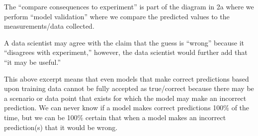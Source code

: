 \documentclass[12pt]{article}
\begin{document}
\begin{enumerate}
\begin{tcolorbox}[colback=white, sharp corners]
The 	``compare consequences to experiment'' is part of the diagram in 2a where we perform 	``model validation'' where we compare the predicted values to the measurements/data collected.

\end{tcolorbox}


\begin{tcolorbox}[colback=white, sharp corners]

A data scientist may agree with the claim that the guess is ``wrong'' because it ``disagrees with experiment,'' however, the data scientist would further add that ``it may be useful.''

\end{tcolorbox}


\begin{tcolorbox}[colback=white, sharp corners]

This above excerpt means that even models that make correct predictions based upon training data cannot be fully accepted as true/correct because there may be a scenario or data point that exists for which the model may make an incorrect prediction. We can never know if a model makes correct predictions 100\% of the time, but we can be 100\% certain that when a model makes an incorrect prediction(s) that it would be wrong. 

\end{tcolorbox}

 


\end{enumerate}
\end{document}
